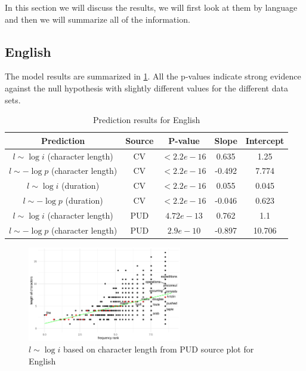 In this section we will discuss the results, we will first look at them by language and then we will summarize all of the information.

\subsection{English}

The model results are summarized in \cref{tab:englishresults}. All the p-values indicate strong evidence against the null hypothesis with slightly different values for the different data sets.

\begin{table}[H]
    \centering
    \begin{tabular}{c|c|c|c|c}
        Prediction & Source & P-value & Slope & Intercept \\ \hline
        $l \sim \log i$ (character length) & CV & $<2.2e-16$ & 0.635 & 1.25 \\
        $l \sim -\log p$ (character length) & CV & $<2.2e-16$ & -0.492 & 7.774 \\
        $l \sim \log i$ (duration) & CV & $<2.2e-16$ & 0.055 & 0.045 \\
        $l \sim -\log p$ (duration) & CV & $<2.2e-16$ & -0.046 & 0.623 \\
        $l \sim \log i$ (character length) & PUD & $4.72e-13$ & 0.762 & 1.1 \\
        $l \sim -\log p$ (character length) & PUD & $2.9e-10$ & -0.897 & 10.706 \\
    \end{tabular}
    \caption{Prediction results for English}
    \label{tab:englishresults}
\end{table}

\begin{figure}[H]
    \centering
    \includegraphics[width=0.6\textwidth]{plots/English_logi_cl_PUD.pdf}
    \caption{$l \sim \log i$ based on character length from PUD source plot for English}
    \label{english_logi_cl_PUD}
\end{figure}

